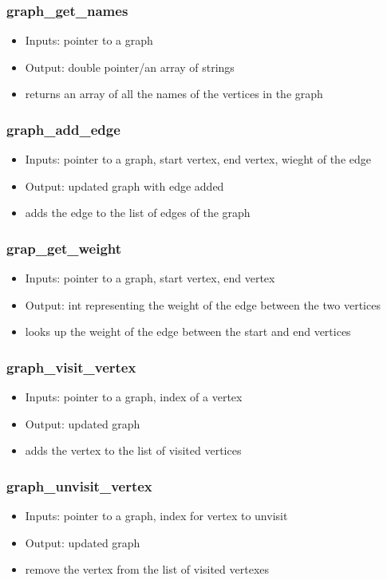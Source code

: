 \documentclass{article}
\begin{document}
\subsubsection{graph\_get\_names}
\begin{itemize}
    \item Inputs: pointer to a graph 
    \item Output: double pointer/an array of strings 
    \item returns an array of all the names of the vertices in the graph 
\end{itemize}
\subsubsection{graph\_add\_edge}
\begin{itemize}
    \item Inputs: pointer to a graph, start vertex, end vertex, wieght of the edge 
    \item Output: updated graph with edge added
    \item adds the edge to the list of edges of the graph 
\end{itemize}
\subsubsection{grap\_get\_weight}
\begin{itemize}
    \item Inputs: pointer to a graph, start vertex, end vertex 
    \item Output: int representing the weight of the edge between the two vertices
    \item looks up the weight of the edge between the start and end vertices 
\end{itemize}
\subsubsection{graph\_visit\_vertex}
\begin{itemize}
    \item Inputs: pointer to a graph, index of a vertex
    \item Output: updated graph
    \item adds the vertex to the list of visited vertices 
\end{itemize}
\subsubsection{graph\_unvisit\_vertex}
\begin{itemize}
    \item Inputs: pointer to a graph, index for vertex to unvisit
    \item Output: updated graph
    \item remove the vertex from the list of visited vertexes 
\end{itemize}
\end{document}

